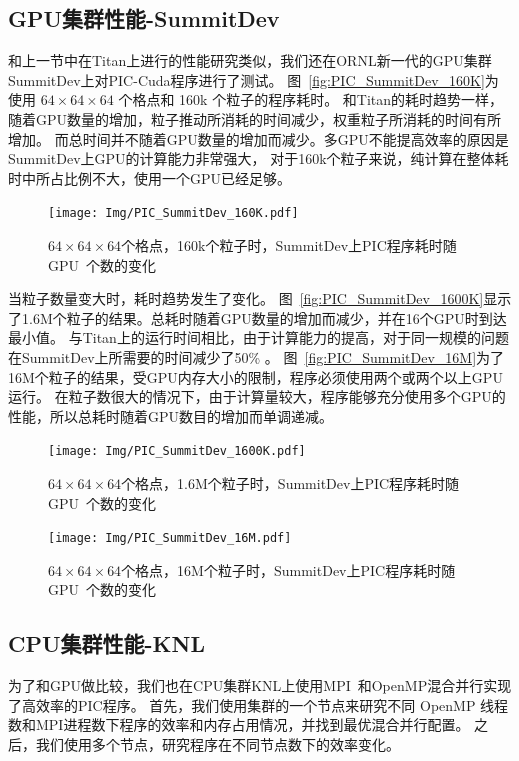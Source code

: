 \subsection{GPU集群性能-SummitDev}
和上一节中在Titan上进行的性能研究类似，我们还在ORNL新一代的GPU集群SummitDev上对PIC-Cuda程序进行了测试。
图~\eqref{fig:PIC_SummitDev_160K}为使用 $64\times64\times64$ 个格点和  160k 个粒子的程序耗时。
和Titan的耗时趋势一样，随着GPU数量的增加，粒子推动所消耗的时间减少，权重粒子所消耗的时间有所增加。
而总时间并不随着GPU数量的增加而减少。多GPU不能提高效率的原因是SummitDev上GPU的计算能力非常强大，
对于160k个粒子来说，纯计算在整体耗时中所占比例不大，使用一个GPU已经足够。

\begin{figure}[!htb]
  \centering
  \texttt{[image: Img/PIC\_SummitDev\_160K.pdf]}
  \caption{$64 \times 64 \times 64$个格点，160k个粒子时，SummitDev上PIC程序耗时随GPU~个数的变化}
  \label{fig:PIC_SummitDev_160K}
\end{figure}

当粒子数量变大时，耗时趋势发生了变化。
图~\eqref{fig:PIC_SummitDev_1600K}显示了1.6M个粒子的结果。总耗时随着GPU数量的增加而减少，并在16个GPU时到达最小值。
与Titan上的运行时间相比，由于计算能力的提高，对于同一规模的问题在SummitDev上所需要的时间减少了50\% 。
图~\eqref{fig:PIC_SummitDev_16M}为了16M个粒子的结果，受GPU内存大小的限制，程序必须使用两个或两个以上GPU运行。
在粒子数很大的情况下，由于计算量较大，程序能够充分使用多个GPU的性能，所以总耗时随着GPU数目的增加而单调递减。

\begin{figure}[!htb]
  \centering
  \texttt{[image: Img/PIC\_SummitDev\_1600K.pdf]}
  \caption{$64 \times 64 \times 64$个格点，1.6M个粒子时，SummitDev上PIC程序耗时随GPU~个数的变化}
  \label{fig:PIC_SummitDev_1600K}
\end{figure}

\begin{figure}[!htb]
  \centering
  \texttt{[image: Img/PIC\_SummitDev\_16M.pdf]}
  \caption{$64 \times 64 \times 64$个格点，16M个粒子时，SummitDev上PIC程序耗时随GPU~个数的变化}
  \label{fig:PIC_SummitDev_16M}
\end{figure}

\subsection{CPU集群性能-KNL}        \label{section:PIC_Performance_CPUcluster}
为了和GPU做比较，我们也在CPU集群KNL上使用MPI~和OpenMP混合并行实现了高效率的PIC程序。
首先，我们使用集群的一个节点来研究不同 OpenMP 线程数和MPI进程数下程序的效率和内存占用情况，并找到最优混合并行配置。
之后，我们使用多个节点，研究程序在不同节点数下的效率变化。

